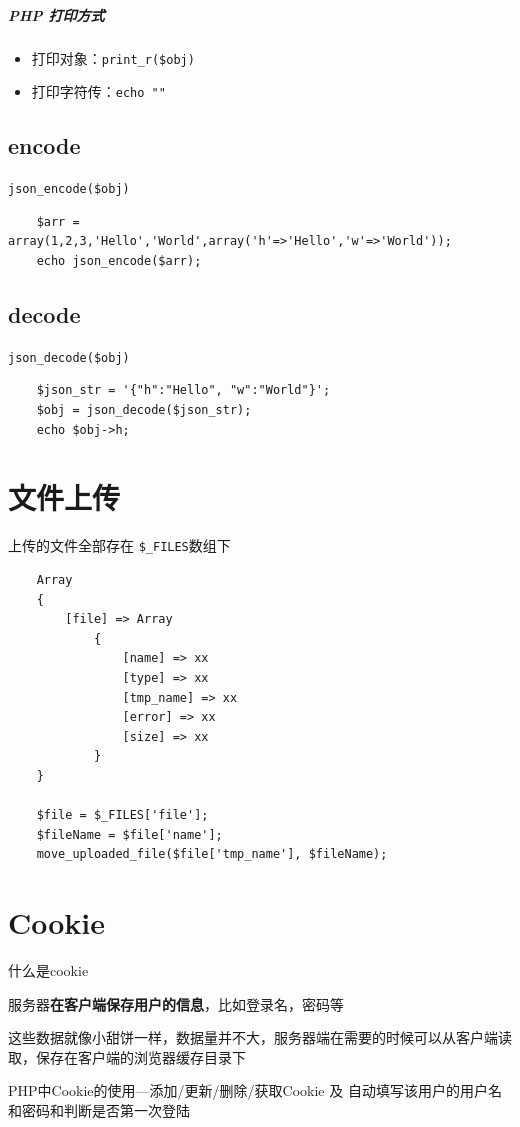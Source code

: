 \documentclass[UTF8,a4paper,12pt]{ctexbook}
\begin{document}
			\subparagraph{PHP 打印方式}
				\begin{itemize}
					\item 打印对象：\verb|print_r($obj)|
					\item 打印字符传：\verb|echo ""|
				\end{itemize}
			
		\subsection{encode}
			\verb|json_encode($obj)|
			
			\begin{lstlisting}
	$arr = array(1,2,3,'Hello','World',array('h'=>'Hello','w'=>'World'));
	echo json_encode($arr);
			\end{lstlisting}
		
		\subsection{decode}
			\verb|json_decode($obj)|
			
			\begin{lstlisting}
	$json_str = '{"h":"Hello", "w":"World"}';
	$obj = json_decode($json_str);
	echo $obj->h;
			\end{lstlisting}
		
	\section{文件上传}
		上传的文件全部存在 \verb|$_FILES|数组下
		\begin{lstlisting}
	Array
	{
		[file] => Array
			{
				[name] => xx
				[type] => xx
				[tmp_name] => xx
				[error] => xx
				[size] => xx
			}
	}
	
	$file = $_FILES['file'];
	$fileName = $file['name'];
	move_uploaded_file($file['tmp_name'], $fileName);
		\end{lstlisting}
	
	\section{Cookie}
		什么是cookie
		
		服务器\textbf{在客户端保存用户的信息}，比如登录名，密码等
		
		这些数据就像小甜饼一样，数据量并不大，服务器端在需要的时候可以从客户端读取，保存在客户端的浏览器缓存目录下

		PHP中Cookie的使用---添加/更新/删除/获取Cookie 及 自动填写该用户的用户名和密码和判断是否第一次登陆
\end{document}
